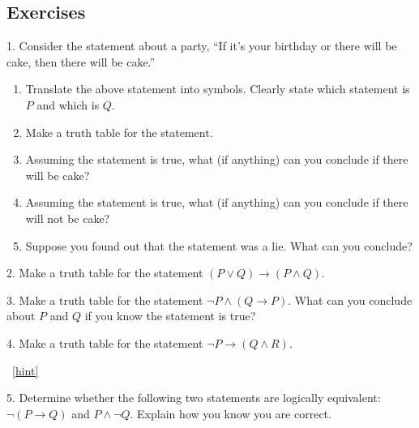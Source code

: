\documentclass[10pt,]{book}
\theoremstyle{plain}
\theoremstyle{definition}
\theoremstyle{definition}
\theoremstyle{definition}
\numberwithin{equation}{chapter}
\def\imp{\rightarrow}
\begin{document}
\subsection*{Exercises}\label{exercises_sec-logic}
\begin{exerciselist}
\item[1.]\hypertarget{exercise-99}{}\hypertarget{p-2426}{}%
Consider the statement about a party, ``If it's your birthday or there will be cake, then there will be cake.''%
\par
\hypertarget{p-2427}{}%
\leavevmode%
\begin{enumerate}[label=(\alph*)]
\item\hypertarget{li-474}{}\hypertarget{p-2428}{}%
Translate the above statement into symbols. Clearly state which statement is \(P\) and which is \(Q\).%
\item\hypertarget{li-475}{}\hypertarget{p-2429}{}%
Make a truth table for the statement.%
\item\hypertarget{li-476}{}\hypertarget{p-2430}{}%
Assuming the statement is true, what (if anything) can you conclude if there will be cake?%
\item\hypertarget{li-477}{}\hypertarget{p-2431}{}%
Assuming the statement is true, what (if anything) can you conclude if there will not be cake?%
\item\hypertarget{li-478}{}\hypertarget{p-2432}{}%
Suppose you found out that the statement was a lie. What can you conclude?%
\end{enumerate}
%
\par\smallskip
\item[2.]\hypertarget{exercise-100}{}\hypertarget{p-2438}{}%
Make a truth table for the statement \((P \vee Q) \imp (P \wedge Q)\).%
\par\smallskip
\item[3.]\hypertarget{exercise-101}{}\hypertarget{p-2439}{}%
Make a truth table for the statement \(\neg P \wedge (Q \imp P)\). What can you conclude about \(P\) and \(Q\) if you know the statement is true?%
\par\smallskip
\item[4.]\hypertarget{exercise-102}{}\hypertarget{p-2441}{}%
Make a truth table for the statement \(\neg P \imp (Q \wedge R)\).%
\par\smallskip
~\hfill{\tiny\hyperlink{a-B.4.4}{[hint]}\hypertarget{q-B.4.4}{}}\item[5.]\hypertarget{exercise-103}{}\hypertarget{p-2443}{}%
Determine whether the following two statements are logically equivalent:  \(\neg(P \imp Q)\) and \(P \wedge \neg Q\). Explain how you know you are correct.%

\end{exerciselist}
\end{document}
